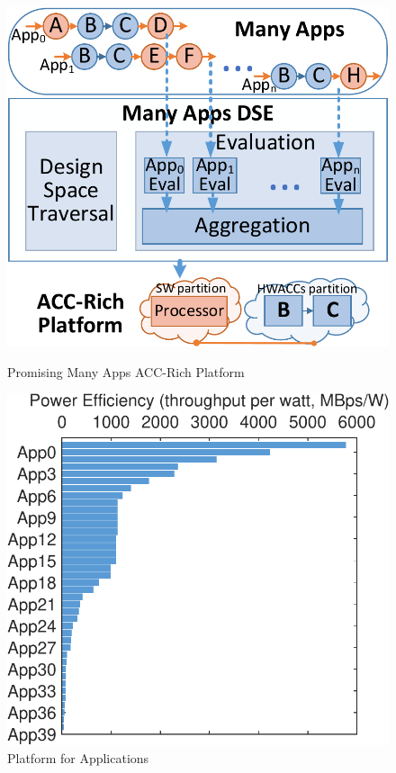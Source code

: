 \begin{figure}[ht]
  \centering
  \begin{minipage}[t]{0.24\textwidth}
    \includegraphics[width=.95\textwidth]{fig/MAARflow.pdf}
    \caption{Promising Many Apps ACC-Rich Platform}
    \label{fig:domainDSE}
  \end{minipage}%
  \hfill
  \begin{minipage}[t]{0.23\textwidth}
    \includegraphics[width=1\textwidth]{fig/effIntro.pdf}
    \caption{Platform  for Applications}
	\label{fig:perf}
  \end{minipage}
\end{figure}

